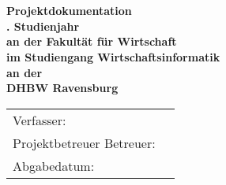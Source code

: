 \begin{titlepage}
	\begin{center}
		\vspace*{1cm}
		\LARGE\bf\myTopic\\
		\Large\rm\mySubTopic\\
		\vspace*{2cm}
		\bf Projektdokumentation\\
		\vspace*{1cm}
		\normalsize\rm
		\myPraxPhase. Studienjahr \\
		\vspace*{1cm}
		an der Fakultät für Wirtschaft\\
		im Studiengang Wirtschaftsinformatik\\
		\vspace*{1cm}
		an der\\
		DHBW Ravensburg
		\vfill
	\end{center}
	\begin{tabular}{ll}
		Verfasser:&\myAutor\\
		Projektbetreuer Betreuer:&\myProf\\
		Abgabedatum:&\myEndDate\\
	\end{tabular}
	
\end{titlepage}
\newpage
\setcounter{page}{2}
